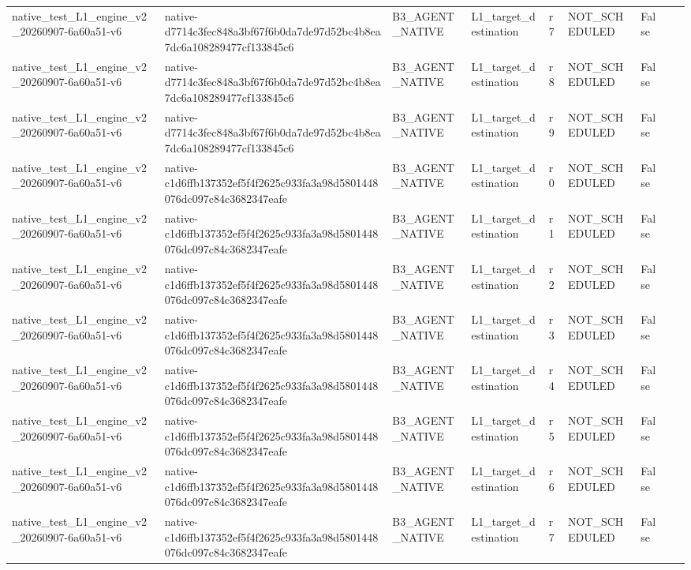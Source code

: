 \begin{tabular}{lllllllll}
native\_test\_L1\_engine\_v2\_20260907-6a60a51-v6 & native-d7714c3fec848a3bf67f6b0da7de97d52bc4b8ea7dc6a108289477cf133845c6 & B3\_AGENT\_NATIVE & L1\_target\_destination & r7 & NOT\_SCHEDULED & False &  &  \\
native\_test\_L1\_engine\_v2\_20260907-6a60a51-v6 & native-d7714c3fec848a3bf67f6b0da7de97d52bc4b8ea7dc6a108289477cf133845c6 & B3\_AGENT\_NATIVE & L1\_target\_destination & r8 & NOT\_SCHEDULED & False &  &  \\
native\_test\_L1\_engine\_v2\_20260907-6a60a51-v6 & native-d7714c3fec848a3bf67f6b0da7de97d52bc4b8ea7dc6a108289477cf133845c6 & B3\_AGENT\_NATIVE & L1\_target\_destination & r9 & NOT\_SCHEDULED & False &  &  \\
native\_test\_L1\_engine\_v2\_20260907-6a60a51-v6 & native-c1d6ffb137352ef5f4f2625c933fa3a98d5801448076dc097c84c3682347eafe & B3\_AGENT\_NATIVE & L1\_target\_destination & r0 & NOT\_SCHEDULED & False &  &  \\
native\_test\_L1\_engine\_v2\_20260907-6a60a51-v6 & native-c1d6ffb137352ef5f4f2625c933fa3a98d5801448076dc097c84c3682347eafe & B3\_AGENT\_NATIVE & L1\_target\_destination & r1 & NOT\_SCHEDULED & False &  &  \\
native\_test\_L1\_engine\_v2\_20260907-6a60a51-v6 & native-c1d6ffb137352ef5f4f2625c933fa3a98d5801448076dc097c84c3682347eafe & B3\_AGENT\_NATIVE & L1\_target\_destination & r2 & NOT\_SCHEDULED & False &  &  \\
native\_test\_L1\_engine\_v2\_20260907-6a60a51-v6 & native-c1d6ffb137352ef5f4f2625c933fa3a98d5801448076dc097c84c3682347eafe & B3\_AGENT\_NATIVE & L1\_target\_destination & r3 & NOT\_SCHEDULED & False &  &  \\
native\_test\_L1\_engine\_v2\_20260907-6a60a51-v6 & native-c1d6ffb137352ef5f4f2625c933fa3a98d5801448076dc097c84c3682347eafe & B3\_AGENT\_NATIVE & L1\_target\_destination & r4 & NOT\_SCHEDULED & False &  &  \\
native\_test\_L1\_engine\_v2\_20260907-6a60a51-v6 & native-c1d6ffb137352ef5f4f2625c933fa3a98d5801448076dc097c84c3682347eafe & B3\_AGENT\_NATIVE & L1\_target\_destination & r5 & NOT\_SCHEDULED & False &  &  \\
native\_test\_L1\_engine\_v2\_20260907-6a60a51-v6 & native-c1d6ffb137352ef5f4f2625c933fa3a98d5801448076dc097c84c3682347eafe & B3\_AGENT\_NATIVE & L1\_target\_destination & r6 & NOT\_SCHEDULED & False &  &  \\
native\_test\_L1\_engine\_v2\_20260907-6a60a51-v6 & native-c1d6ffb137352ef5f4f2625c933fa3a98d5801448076dc097c84c3682347eafe & B3\_AGENT\_NATIVE & L1\_target\_destination & r7 & NOT\_SCHEDULED & False &  &  \\

\end{tabular}
